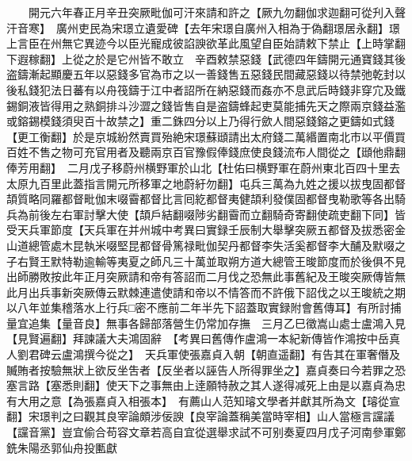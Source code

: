 　　開元六年春正月辛丑突厥毗伽可汗來請和許之【厥九勿翻伽求迦翻可從刋入聲汗音寒】　廣州吏民為宋璟立遺愛碑【去年宋璟自廣州入相為于偽翻璟居永翻】璟上言臣在州無它異迹今以臣光寵成彼諂諛欲革此風望自臣始請敕下禁止【上時掌翻下遐稼翻】上從之於是它州皆不敢立　辛酉敕禁惡錢【武德四年鑄開元通寶錢其後盗鑄漸起顯慶五年以惡錢多官為市之以一善錢售五惡錢民間藏惡錢以待禁弛乾封以後私錢犯法日蕃有以舟筏鑄于江中者詔所在納惡錢而姦亦不息武后時錢非穿宂及鐵錫銅液皆得用之熟銅排斗沙澀之錢皆售自是盗鑄蜂起吏莫能捕先天之際兩京錢益濫或鎔錫模錢須臾百十故禁之】重二銖四分以上乃得行歛人間惡錢鎔之更鑄如式錢【更工衡翻】於是京城紛然賣買殆絶宋璟蘇頲請出太府錢二萬緡置南北市以平價買百姓不售之物可充官用者及聽兩京百官豫假俸錢庶使良錢流布人間從之【頲他鼎翻俸芳用翻】　二月戊子移蔚州横野軍於山北【杜佑曰横野軍在蔚州東北百四十里去太原九百里此蓋指言開元所移軍之地蔚紆勿翻】屯兵三萬為九姓之援以拔曳固都督頡質略同羅都督毗伽末啜霫都督比言囘紇都督夷健頡利發僕固都督曳勒歌等各出騎兵為前後左右軍討擊大使【頡戶結翻啜陟劣翻霫而立翻騎奇寄翻使疏吏翻下同】皆受天兵軍節度【天兵軍在并州城中考異曰實録壬辰制大舉擊突厥五都督及拔悉密金山道總管處木昆執米啜堅昆都督骨篤禄毗伽契丹都督李失活奚都督李大酺及默啜之子右賢王默特勒逾輸等夷夏之師凡三十萬並取朔方道大總管王晙節度而於後俱不見出師勝敗按此年正月突厥請和帝有答詔而二月伐之恐無此事舊紀及王晙突厥傳皆無此月出兵事新突厥傳云默棘連遣使請和帝以不情答而不許俄下詔伐之以王晙統之期以八年並集稽落水上行兵□密不應前二年半先下詔蓋取實録附會舊傳耳】有所討捕量宜追集【量音良】無事各歸部落營生仍常加存撫　三月乙巳徵嵩山處士盧鴻入見【見賢遍翻】拜諫議大夫鴻固辭　【考異曰舊傳作盧鴻一本紀新傳皆作鴻按中岳真人劉君碑云盧鴻撰今從之】　天兵軍使張嘉貞入朝【朝直遥翻】有告其在軍奢僭及贓賄者按驗無狀上欲反坐吿者【反坐者以誣告人所得罪坐之】嘉貞奏曰今若罪之恐塞言路【塞悉則翻】使天下之事無由上逹願特赦之其人遂得减死上由是以嘉貞為忠有大用之意【為張嘉貞入相張本】　有薦山人范知璿文學者并獻其所為文【璿從宣翻】宋璟判之曰觀其良宰論頗涉佞諛【良宰論蓋稱美當時宰相】山人當極言讜議【讜音黨】豈宜偷合苟容文章若高自宜從選舉求試不可别奏夏四月戊子河南參軍鄭銑朱陽丞郭仙舟投匭獻

